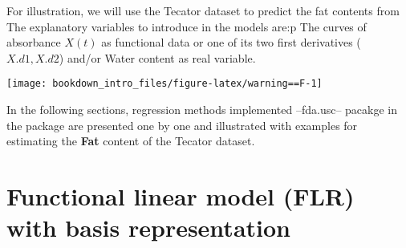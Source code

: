 \documentclass[
]{book}
\newenvironment{Shaded}{\begin{snugshade}}{\end{snugshade}}
\newcommand{\AttributeTok}[1]{\textcolor[rgb]{0.77,0.63,0.00}{#1}}
\newcommand{\CommentTok}[1]{\textcolor[rgb]{0.56,0.35,0.01}{\textit{#1}}}
\newcommand{\DecValTok}[1]{\textcolor[rgb]{0.00,0.00,0.81}{#1}}
\newcommand{\FunctionTok}[1]{\textcolor[rgb]{0.00,0.00,0.00}{#1}}
\newcommand{\NormalTok}[1]{#1}
\newcommand{\OtherTok}[1]{\textcolor[rgb]{0.56,0.35,0.01}{#1}}
\newcommand{\SpecialCharTok}[1]{\textcolor[rgb]{0.00,0.00,0.00}{#1}}
\newcommand{\StringTok}[1]{\textcolor[rgb]{0.31,0.60,0.02}{#1}}
\begin{document}
For illustration, we will use the Tecator dataset to predict the fat contents from
The explanatory variables to introduce in the models are:p The curves of absorbance \(X(t)\) as functional data or one of its two first derivatives (\(X.d1,X.d2\)) and/or Water content as real variable.

\begin{Shaded}
\end{Shaded}

\begin{center}\texttt{[image: bookdown\_intro\_files/figure-latex/warning==F-1]} \end{center}

In the following sections, regression methods implemented --fda.usc-- pacakge in the package are presented one by one and illustrated with examples for estimating the \textbf{Fat} content of the Tecator dataset.

\hypertarget{functional-linear-model-flr-with-basis-representation}{%
\section{Functional linear model (FLR) with basis representation}\label{functional-linear-model-flr-with-basis-representation}}
\end{document}

